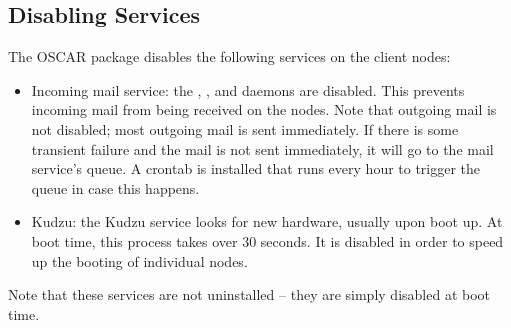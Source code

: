 %
%
%

\subsection{Disabling Services}

The  OSCAR package disables the following
services on the client nodes:

\begin{itemize}
\item Incoming mail service: the , , and
   daemons are disabled.  This prevents incoming mail
  from being received on the nodes.  Note that outgoing mail is not
  disabled; most outgoing mail is sent immediately.  If there is some
  transient failure and the mail is not sent immediately, it will go
  to the mail service's queue.  A  crontab is installed
  that runs every hour to trigger the queue in case this happens.

\item Kudzu: the Kudzu service looks for new hardware, usually upon
  boot up.  At boot time, this process takes over 30 seconds.  It is
  disabled in order to speed up the booting of individual nodes.

\end{itemize}

Note that these services are not uninstalled -- they are simply
disabled at boot time.
